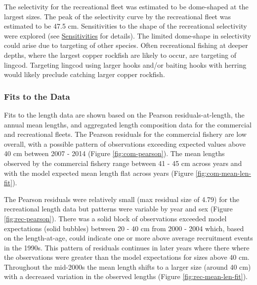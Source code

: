 \documentclass[11pt,
  english,
  a4paper,
]{article}
\begin{document}
\leavevmode\tagmcend\tagstructend\par


The selectivity for the recreational fleet was estimated to be dome-shaped at the largest sizes. The peak of the selectivity curve by the recreational fleet was estimated to be 47.5 cm. Sensitivities to the shape of the recreational selectivity were explored (see {\protect\hyperlink{sensitivities}{Sensitivities}\leavevmode\tagmcend\tagstructend} for details). The limited dome-shape in selectivity could arise due to targeting of other species. Often recreational fishing at deeper depths, where the largest copper rockfish are likely to occur, are targeting of lingcod. Targeting lingcod using larger hooks and/or baiting hooks with herring would likely preclude catching larger copper rockfish.

\leavevmode\tagmcend\tagstructend\par


\hypertarget{fits-to-the-data}{%
\subsubsection{Fits to the Data}\label{fits-to-the-data}}

\leavevmode\tagmcend\tagstructend


Fits to the length data are shown based on the Pearson residuals-at-length, the annual mean lengths, and aggregated length composition data for the commercial and recreational fleets. The Pearson residuals for the commercial fishery are low overall, with a possible pattern of observations exceeding expected values above 40 cm between 2007 - 2014 (Figure \ref{fig:com-pearson}). The mean lengths observed by the commercial fishery range between 41 - 45 cm across years and with the model expected mean length flat across years (Figure \ref{fig:com-mean-len-fit}).

\leavevmode\tagmcend\tagstructend\par


The Pearson residuals were relatively small (max residual size of 4.79) for the recreational length data but patterns were variable by year and sex (Figure \ref{fig:rec-pearson}). There was a solid block of observations exceeded model expectations (solid bubbles) between 20 - 40 cm from 2000 - 2004 which, based on the length-at-age, could indicate one or more above average recruitment events in the 1990s. This pattern of residuals continues in later years where there where the observations were greater than the model expectations for sizes above 40 cm. Throughout the mid-2000s the mean length shifts to a larger size (around 40 cm) with a decreased variation in the observed lengths (Figure \ref{fig:rec-mean-len-fit}).
\end{document}
